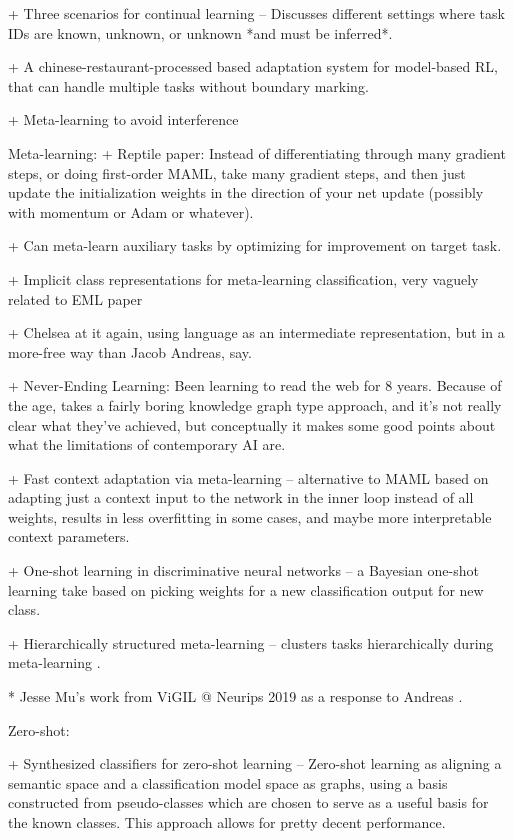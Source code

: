 + Three scenarios for continual learning -- Discusses different settings where task IDs are known, unknown, or unknown *and must be inferred*. \citep{Ven2018}

+ A chinese-restaurant-processed based adaptation system for model-based RL, that can handle multiple tasks without boundary marking. \citep{Nagabandi2019}

+ Meta-learning to avoid interference \citep{Velez2017}



Meta-learning:
+ Reptile paper: Instead of differentiating through many gradient steps, or doing first-order MAML, take many gradient steps, and then just update the initialization weights in the direction of your net update (possibly with momentum or Adam or whatever). \citep{Nichol2018} 

+ Can meta-learn auxiliary tasks by optimizing for improvement on target task. \citep{Liu2019a}

+ Implicit class representations for meta-learning classification, very vaguely related to EML paper \citep{Ravichandran2019}

+ Chelsea at it again, using language as an intermediate representation, but in a more-free way than Jacob Andreas, say. \citep{Jiang2019}

+ Never-Ending Learning: Been learning to read the web for 8 years. Because of the age, takes a fairly boring knowledge graph type approach, and it's not really clear what they've achieved, but conceptually it makes some good points about what the limitations of contemporary AI are. \citep{Mitchell2018}

+ Fast context adaptation via meta-learning -- alternative to MAML based on adapting just a context input to the network in the inner loop instead of all weights, results in less overfitting in some cases, and maybe more interpretable context parameters. \citep{Zintgraf2018}

+ One-shot learning in discriminative neural networks -- a Bayesian one-shot learning take based on picking weights for a new classification output for new class. \citep{Burgess2016}

+ Hierarchically structured meta-learning -- clusters tasks hierarchically during meta-learning \citep{Yao2019}.

* Jesse Mu's work from ViGIL @ Neurips 2019 as a response to Andreas \citep{Mu2019}.


Zero-shot:

+ Synthesized classifiers for zero-shot learning -- Zero-shot learning as aligning a semantic space and a classification model space as graphs, using a basis constructed from pseudo-classes which are chosen to serve as a useful basis for the known classes. This approach allows for pretty decent performance. \citep{Changpinyo2016} 

